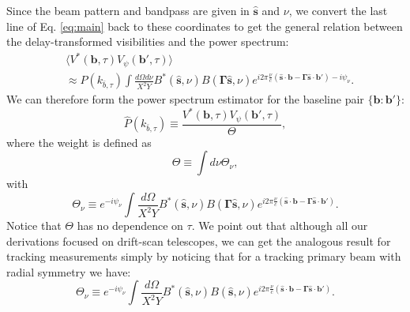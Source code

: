\documentclass[twocolumn,apj,numberedappendix]{emulateapj}
\renewcommand\[{\begin{equation}}
\renewcommand\]{\end{equation}}
\begin{document}
Since the beam pattern and bandpass are given in $\hat{\boldsymbol{s}}$
and $\nu$, we convert the last line of Eq. \eqref{eq:main} back to these coordinates to get
the general relation between the delay-transformed visibilities and
the power spectrum:
\begin{equation}
\begin{aligned} & \langle V^{*}(\boldsymbol{b},\tau)V_{\psi}(\boldsymbol{b'},\tau)\rangle\\
 & \approx P(k_{\bar{b}, \tau})\int\frac{d\Omega d\nu}{X^{2}Y}B^{*}(\hat{\boldsymbol{s}},\nu)B(\boldsymbol{\Gamma}\hat{\boldsymbol{s}},\nu) e^{i2\pi\frac{\nu}{c}\left(\hat{\boldsymbol{s}}\cdot\boldsymbol{b}-\boldsymbol{\Gamma}\hat{\boldsymbol{s}}\cdot\boldsymbol{b'}\right)-i\psi_{\nu}}.
 \end{aligned}
\label{eq:final}
\end{equation}
We can therefore form the power spectrum estimator for the baseline pair $\{\boldsymbol b: \boldsymbol  b'\}$:
\begin{equation}
 \hat{P}(k_{\bar{b}, \tau}) \equiv \frac{V^{*}(\boldsymbol{b},\tau)V_{\psi}(\boldsymbol{b'},\tau)}{\Theta}, 
 \label{eq:opp}
\end{equation}
where the weight is defined as 
\begin{equation}
\Theta \equiv\int d\nu \Theta_{\nu}, 
\label{eq:Theta}
\end{equation}
with
\[
\Theta_{\nu} \equiv e^{-i\psi_{\nu}} \int \frac{d\Omega}{X^{2}Y}B^{*}(\hat{\boldsymbol{s}},\nu)B(\boldsymbol{\Gamma}\hat{\boldsymbol{s}},\nu) e^{i2\pi\frac{\nu}{c}\left(\hat{\boldsymbol{s}}\cdot\boldsymbol{b}-\boldsymbol{\Gamma}\hat{\boldsymbol{s}}\cdot\boldsymbol{b'}\right)}.
\label{eq:Thetanu}
\]
Notice that $\Theta$ has no dependence on $\tau$. We point out that although all our derivations focused on drift-scan telescopes, we can get the analogous result for tracking measurements simply by noticing that for a tracking primary beam with radial symmetry we have:
\[
\Theta_{\nu} \equiv e^{-i\psi_{\nu}} \int \frac{d\Omega}{X^{2}Y}B^{*}(\hat{\boldsymbol{s}},\nu)B(\hat{\boldsymbol{s}},\nu) e^{i2\pi\frac{\nu}{c}\left(\hat{\boldsymbol{s}}\cdot\boldsymbol{b}-\boldsymbol{\Gamma}\hat{\boldsymbol{s}}\cdot\boldsymbol{b'}\right)}.
\label{eq:Thetanu_tracking}
\]
\end{document}
